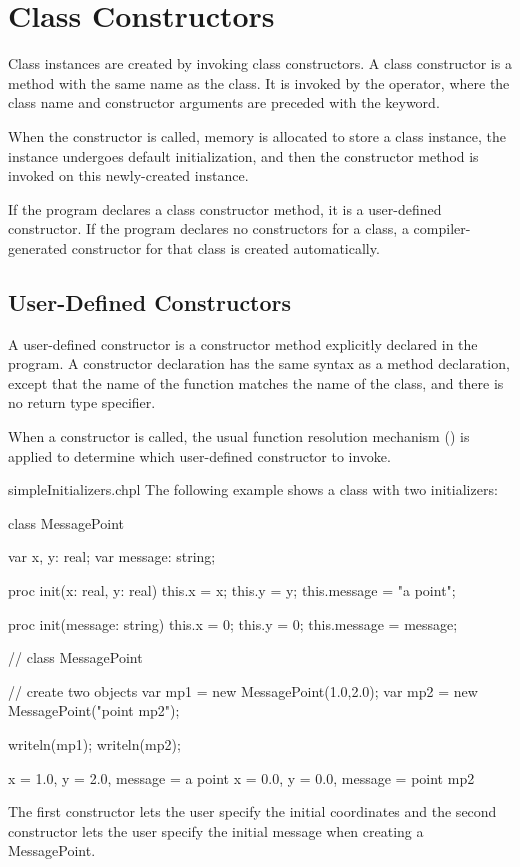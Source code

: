 \section{Class Constructors}
\label{Class_Constructors}

Class instances are created by invoking class constructors.
A class constructor is a method with the same name as the class.
It is invoked by the  operator, where the
class name and constructor arguments are preceded with the
 keyword.

When the constructor is called, memory is allocated to store
a class instance, the instance undergoes default initialization, and
then the constructor method is invoked on this newly-created
instance.

If the program declares a class constructor method,
it is a user-defined constructor.  
If the program declares no constructors for a class,
a compiler-generated constructor for that class is created automatically.

\subsection{User-Defined Constructors}
\label{User_Defined_Constructors}

A user-defined constructor is a constructor method explicitly declared
in the program.  A constructor declaration has the same
syntax as a method declaration, except that the name of the function matches
the name of the class, and there is no return type specifier.

When a constructor is called, the usual function resolution mechanism
() is applied to determine which
user-defined constructor to invoke.

\begin{chapelexample}{simpleInitializers.chpl}
The following example shows a class with two initializers:
\begin{chapel}
class MessagePoint {
  var x, y: real;
  var message: string;

  proc init(x: real, y: real) {
    this.x = x;
    this.y = y;
    this.message = "a point";
  }

  proc init(message: string) {
    this.x = 0;
    this.y = 0;
    this.message = message;
  }
}  // class MessagePoint

// create two objects
var mp1 = new MessagePoint(1.0,2.0);
var mp2 = new MessagePoint("point mp2");
\end{chapel}
\begin{chapelpost}
writeln(mp1);
writeln(mp2);
\end{chapelpost}
\begin{chapeloutput}
{x = 1.0, y = 2.0, message = a point}
{x = 0.0, y = 0.0, message = point mp2}
\end{chapeloutput}
The first constructor lets the user specify the initial coordinates
and the second constructor lets the user specify the initial message
when creating a MessagePoint.
\end{chapelexample}

